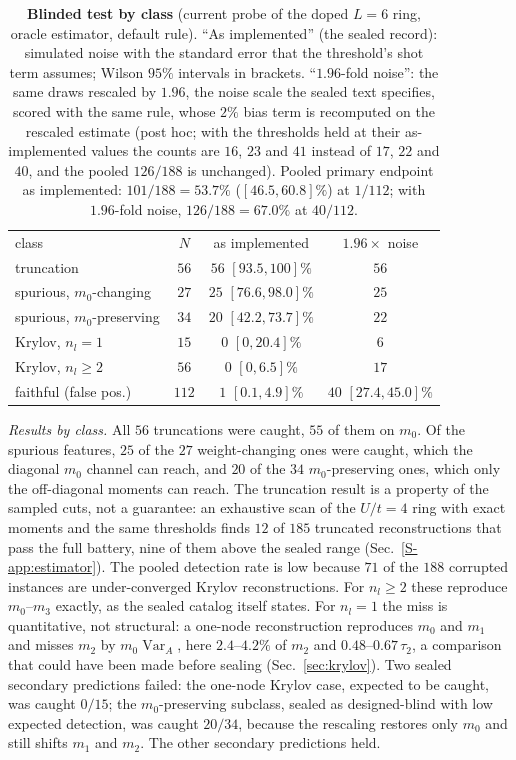 \documentclass[aps,prb,reprint,onecolumn,12pt,superscriptaddress,longbibliography,floatfix]{revtex4-2}
\begin{document}
\begin{table}[t]
\caption{\label{tab:blind}\textbf{Blinded test by class} (current probe of the doped $L=6$ ring, oracle estimator, default rule). ``As implemented'' (the sealed record): simulated noise with the standard error that the threshold's shot term assumes; Wilson $95\%$ intervals in brackets. ``$1.96$-fold noise'': the same draws rescaled by $1.96$, the noise scale the sealed text specifies, scored with the same rule, whose $2\%$ bias term is recomputed on the rescaled estimate (post hoc; with the thresholds held at their as-implemented values the counts are $16$, $23$ and $41$ instead of $17$, $22$ and $40$, and the pooled $126/188$ is unchanged). Pooled primary endpoint as implemented: $101/188=53.7\%$ ($[46.5,60.8]\%$) at $1/112$; with $1.96$-fold noise, $126/188=67.0\%$ at $40/112$.}
\footnotesize
\begin{ruledtabular}
\begin{tabular}{lccc}
class & $N$ & as implemented & $1.96\times$ noise \\
\colrule
truncation & $56$ & $56$ $[93.5,100]\%$ & $56$ \\
spurious, $m_0$-changing & $27$ & $25$ $[76.6,98.0]\%$ & $25$ \\
spurious, $m_0$-preserving & $34$ & $20$ $[42.2,73.7]\%$ & $22$ \\
Krylov, $n_l=1$ & $15$ & $0$ $[0,20.4]\%$ & $6$ \\
Krylov, $n_l\ge2$ & $56$ & $0$ $[0,6.5]\%$ & $17$ \\
\colrule
faithful (false pos.) & $112$ & $1$ $[0.1,4.9]\%$ & $40$ $[27.4,45.0]\%$ \\
\end{tabular}
\end{ruledtabular}
\end{table}

\emph{Results by class.} All $56$ truncations were caught, $55$ of them on $m_0$. Of the spurious features, $25$ of the $27$ weight-changing ones were caught, which the diagonal $m_0$ channel can reach, and $20$ of the $34$ $m_0$-preserving ones, which only the off-diagonal moments can reach. The truncation result is a property of the sampled cuts, not a guarantee: an exhaustive scan of the $U/t=4$ ring with exact moments and the same thresholds finds $12$ of $185$ truncated reconstructions that pass the full battery, nine of them above the sealed range (Sec.~\ref{S-app:estimator}). The pooled detection rate is low because $71$ of the $188$ corrupted instances are under-converged Krylov reconstructions. For $n_l\ge2$ these reproduce $m_0$--$m_3$ exactly, as the sealed catalog itself states. For $n_l=1$ the miss is quantitative, not structural: a one-node reconstruction reproduces $m_0$ and $m_1$ and misses $m_2$ by $m_0\operatorname{Var}_A$, here $2.4$--$4.2\%$ of $m_2$ and $0.48$--$0.67\,\tau_2$, a comparison that could have been made before sealing (Sec.~\ref{sec:krylov}). Two sealed secondary predictions failed: the one-node Krylov case, expected to be caught, was caught $0/15$; the $m_0$-preserving subclass, sealed as designed-blind with low expected detection, was caught $20/34$, because the rescaling restores only $m_0$ and still shifts $m_1$ and $m_2$. The other secondary predictions held.
\end{document}
